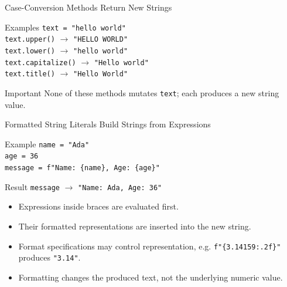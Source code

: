 \documentclass[aspectratio=169,10pt]{beamer}
\begin{document}
\begin{frame}{Case-Conversion Methods Return New Strings}
  \begin{block}{Examples}
    \texttt{text = "hello world"}\\[0.08in]
    \texttt{text.upper()} $\longrightarrow$ \texttt{"HELLO WORLD"}\\
    \texttt{text.lower()} $\longrightarrow$ \texttt{"hello world"}\\
    \texttt{text.capitalize()} $\longrightarrow$ \texttt{"Hello world"}\\
    \texttt{text.title()} $\longrightarrow$ \texttt{"Hello World"}
  \end{block}

  \begin{alertblock}{Important}
    None of these methods mutates \texttt{text}; each produces a new string value.
  \end{alertblock}
\end{frame}

\begin{frame}{Formatted String Literals Build Strings from Expressions}
  \begin{block}{Example}
    \texttt{name = "Ada"}\\
    \texttt{age = 36}\\
    \texttt{message = f"Name: \{name\}, Age: \{age\}"}
  \end{block}

  \begin{block}{Result}
    \texttt{message} $\longrightarrow$ \texttt{"Name: Ada, Age: 36"}
  \end{block}

  \begin{itemize}
    \item Expressions inside braces are evaluated first.
    \item Their formatted representations are inserted into the new string.
    \item Format specifications may control representation, e.g. \texttt{f"\{3.14159:.2f\}"} produces \texttt{"3.14"}.
    \item Formatting changes the produced text, not the underlying numeric value.
  \end{itemize}
\end{frame}
\end{document}
